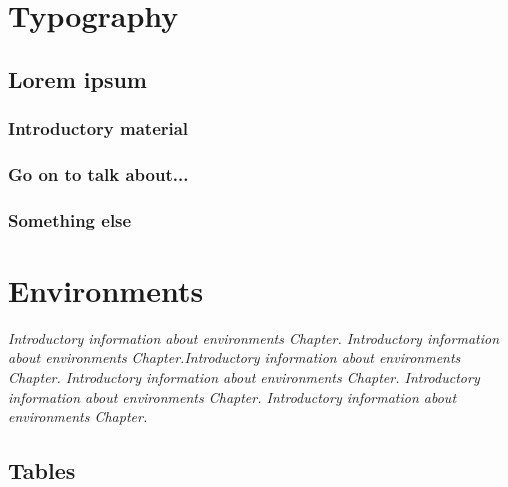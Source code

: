 \chapter{Typography}

\begin{main-points}%
	\item \lipsum[1]
	\item \lipsum[2]
	\item \lipsum[3]
\end{main-points}

\section{Lorem ipsum}

\lipsum[1]

\subsection{Introductory material}

\lipsum[2-3]

\subsection{Go on to talk about...}

\lipsum[4]

\subsection{Something else}

\lipsum[5-6]


\chapter{Environments}

{ \itshape
	Introductory information about environments Chapter. Introductory information about environments Chapter.Introductory information about environments Chapter. Introductory information about environments Chapter. Introductory information about environments Chapter. Introductory information about environments Chapter.
}

\section{Tables}



